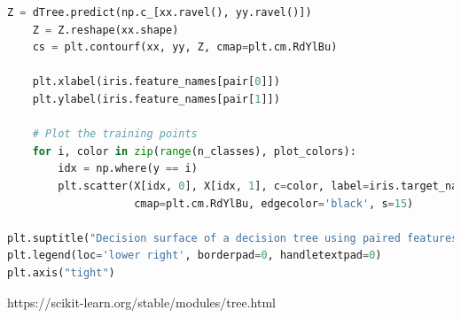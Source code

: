 \documentclass[
  12pt, %
  a4paper, %
  oneside, %
  openany, 
  numbers=noenddot, %
  BCOR=5mm, %
  parskip=half*, %
  thesis, %
]{bfhbook}
\begin{document}
\begin{lstlisting}[language=Python, caption=Decision Tree Visualisierung]
    Z = dTree.predict(np.c_[xx.ravel(), yy.ravel()])
    Z = Z.reshape(xx.shape)
    cs = plt.contourf(xx, yy, Z, cmap=plt.cm.RdYlBu)

    plt.xlabel(iris.feature_names[pair[0]])
    plt.ylabel(iris.feature_names[pair[1]])

    # Plot the training points
    for i, color in zip(range(n_classes), plot_colors):
        idx = np.where(y == i)
        plt.scatter(X[idx, 0], X[idx, 1], c=color, label=iris.target_names[i],
                    cmap=plt.cm.RdYlBu, edgecolor='black', s=15)

plt.suptitle("Decision surface of a decision tree using paired features")
plt.legend(loc='lower right', borderpad=0, handletextpad=0)
plt.axis("tight")
\end{lstlisting}
https://scikit-learn.org/stable/modules/tree.html
\end{document}
